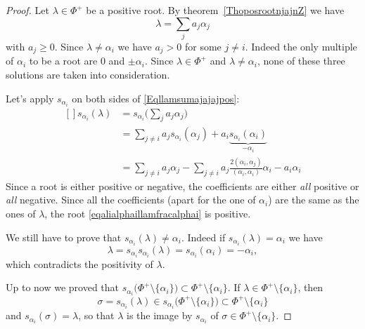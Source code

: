 \begin{proof}
    Let \( \lambda\in\Phi^+\) be a positive root. By theorem~\ref{ThoposrootnjajnZ} we have
    \begin{equation}        \label{Eqllamsumajajajpos}
        \lambda=\sum_ja_j\alpha_j
    \end{equation}
    with \( a_j\geq 0\). Since \( \lambda\neq\alpha_i\) we have \( a_j>0\) for some \( j\neq i\). Indeed the only multiple of \( \alpha_i\) to be a root are \( 0\) and \( \pm\alpha_i\). Since \( \lambda\in\Phi^+\) and \( \lambda\neq \alpha_i\), none of these three solutions are taken into consideration.

    Let's apply \( s_{\alpha_i}\) on both sides of \eqref{Eqllamsumajajajpos}:
    \begin{equation}        \label{eqalialphaillamfracalphai}
        \begin{aligned}[]
            s_{\alpha_i}(\lambda)&=s_{\alpha_i}\big( \sum_ja_j\alpha_j \big)\\
            &=\sum_{j\neq i}a_js_{\alpha_i}(\alpha_j)+a_i\underbrace{s_{\alpha_i}(\alpha_i)}_{-\alpha_i}\\
            &=\sum_{j\neq i}a_j\alpha_j-\sum_{j\neq i}a_j\frac{ 2(\alpha_i,\alpha_j) }{ (\alpha_i,\alpha_i) }\alpha_i-a_i\alpha_i
        \end{aligned}
    \end{equation}
    Since a root is either positive or negative, the coefficients are either \emph{all} positive or \emph{all} negative. Since all the coefficients (apart for the one of \( \alpha_i\)) are the same as the ones of \( \lambda\), the root \eqref{eqalialphaillamfracalphai} is positive.

    We still have to prove that \( s_{\alpha_i}(\lambda)\neq \alpha_i\). Indeed if \( s_{\alpha_i}(\lambda)=\alpha_i\) we have
    \begin{equation}
        \lambda=s_{\alpha_i}s_{\alpha_i}(\lambda)=s_{\alpha_i}(\alpha_i)=-\alpha_i,
    \end{equation}
    which contradicts the positivity of \( \lambda\).

    Up to now we proved that \( s_{\alpha_i}\big( \Phi^+\setminus\{ \alpha_i \} \big)\subset\Phi^+\setminus\{ \alpha_i \}\). If \( \lambda\in\Phi^+\setminus\{ \alpha_i \}\), then
    \begin{equation}
        \sigma=s_{\alpha_i}(\lambda)\in s_{\alpha_i}\big( \Phi^+\setminus\{ \alpha_i \} \big)\subset\Phi^+\setminus\{ \alpha_i \}
    \end{equation}
    and \( s_{\alpha_i}(\sigma)=\lambda\), so that \( \lambda\) is the image by \( s_{\alpha_i}\) of \( \sigma\in\Phi^+\setminus\{ \alpha_i \}\).
\end{proof}


